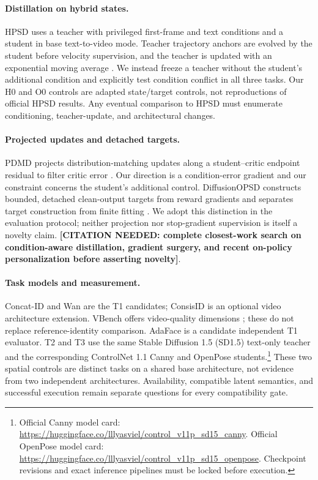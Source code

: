 \documentclass[11pt]{article}
\newcommand{\cneed}[1]{\textbf{[CITATION NEEDED: #1]}}
\begin{document}
\paragraph{Distillation on hybrid states.}
HPSD uses a teacher with privileged first-frame and text conditions and a student in base text-to-video mode. Teacher trajectory anchors are evolved by the student before velocity supervision, and the teacher is updated with an exponential moving average \cite{hpsd}. We instead freeze a teacher without the student's additional condition and explicitly test condition conflict in all three tasks. Our H0 and O0 controls are adapted state/target controls, not reproductions of official HPSD results. Any eventual comparison to HPSD must enumerate conditioning, teacher-update, and architectural changes.

\paragraph{Projected updates and detached targets.}
PDMD projects distribution-matching updates along a student--critic endpoint residual to filter critic error \cite{pdmd}. Our direction is a condition-error gradient and our constraint concerns the student's additional control. DiffusionOPSD constructs bounded, detached clean-output targets from reward gradients and separates target construction from finite fitting \cite{diffusionopsd}. We adopt this distinction in the evaluation protocol; neither projection nor stop-gradient supervision is itself a novelty claim. \cneed{complete closest-work search on condition-aware distillation, gradient surgery, and recent on-policy personalization before asserting novelty}.

\paragraph{Task models and measurement.}
Concat-ID \cite{concatid} and Wan \cite{wan} are the T1 candidates; ConsisID \cite{consisid} is an optional video architecture extension. VBench offers video-quality dimensions \cite{vbench}; these do not replace reference-identity comparison. AdaFace \cite{adaface} is a candidate independent T1 evaluator. T2 and T3 use the same Stable Diffusion 1.5 (SD1.5) text-only teacher and the corresponding ControlNet 1.1 Canny and OpenPose students.\footnote{Official Canny model card: \url{https://huggingface.co/lllyasviel/control_v11p_sd15_canny}. Official OpenPose model card: \url{https://huggingface.co/lllyasviel/control_v11p_sd15_openpose}. Checkpoint revisions and exact inference pipelines must be locked before execution.} These two spatial controls are distinct tasks on a shared base architecture, not evidence from two independent architectures. Availability, compatible latent semantics, and successful execution remain separate questions for every compatibility gate.
\end{document}
